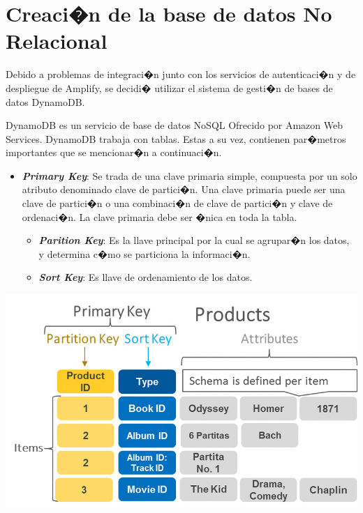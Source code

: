 \documentclass[12pt,letterpaper]{article}
\begin{document}
\newpage

\section{Creaci�n de la base de datos No Relacional}

Debido a problemas de integraci�n junto con los servicios de autenticaci�n y de despliegue de Amplify, se decidi� utilizar el sistema de gesti�n de bases de datos DynamoDB.

DynamoDB es un servicio de base de datos NoSQL Ofrecido por Amazon Web Services. DynamoDB trabaja con tablas. Estas a su vez, contienen par�metros importantes que se mencionar�n a continuaci�n.



\begin{itemize}
\item \textbf{\emph{Primary Key}}: Se trada de una clave primaria simple, compuesta por un solo atributo denominado clave de partici�n. Una clave primaria puede ser una clave de partici�n o una combinaci�n de clave de partici�n y clave de ordenaci�n. La clave primaria debe ser �nica en toda la tabla.
\begin{itemize}
\item \textbf{\emph{Parition Key}}: Es la llave principal por la cual se agrupar�n los datos, y determina c�mo se particiona la informaci�n.

\item \textbf{\emph{Sort Key}}: Es llave de ordenamiento de los datos.

\end{itemize}

\end{itemize}

\begin{center}
  \includegraphics[scale=0.5]{imagenes/dynamo}
 \label{fig:cognito} 
\end{center} 
\end{document}
